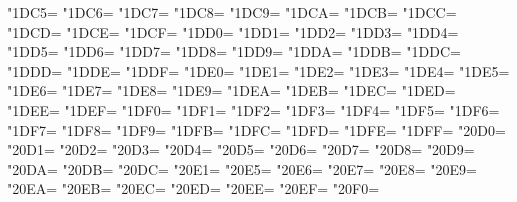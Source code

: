 \XeTeXcharclass"1DC5=\KclassCM
\XeTeXcharclass"1DC6=\KclassCM
\XeTeXcharclass"1DC7=\KclassCM
\XeTeXcharclass"1DC8=\KclassCM
\XeTeXcharclass"1DC9=\KclassCM
\XeTeXcharclass"1DCA=\KclassCM
\XeTeXcharclass"1DCB=\KclassCM
\XeTeXcharclass"1DCC=\KclassCM
\XeTeXcharclass"1DCD=\KclassCM
\XeTeXcharclass"1DCE=\KclassCM
\XeTeXcharclass"1DCF=\KclassCM
\XeTeXcharclass"1DD0=\KclassCM
\XeTeXcharclass"1DD1=\KclassCM
\XeTeXcharclass"1DD2=\KclassCM
\XeTeXcharclass"1DD3=\KclassCM
\XeTeXcharclass"1DD4=\KclassCM
\XeTeXcharclass"1DD5=\KclassCM
\XeTeXcharclass"1DD6=\KclassCM
\XeTeXcharclass"1DD7=\KclassCM
\XeTeXcharclass"1DD8=\KclassCM
\XeTeXcharclass"1DD9=\KclassCM
\XeTeXcharclass"1DDA=\KclassCM
\XeTeXcharclass"1DDB=\KclassCM
\XeTeXcharclass"1DDC=\KclassCM
\XeTeXcharclass"1DDD=\KclassCM
\XeTeXcharclass"1DDE=\KclassCM
\XeTeXcharclass"1DDF=\KclassCM
\XeTeXcharclass"1DE0=\KclassCM
\XeTeXcharclass"1DE1=\KclassCM
\XeTeXcharclass"1DE2=\KclassCM
\XeTeXcharclass"1DE3=\KclassCM
\XeTeXcharclass"1DE4=\KclassCM
\XeTeXcharclass"1DE5=\KclassCM
\XeTeXcharclass"1DE6=\KclassCM
\XeTeXcharclass"1DE7=\KclassCM
\XeTeXcharclass"1DE8=\KclassCM
\XeTeXcharclass"1DE9=\KclassCM
\XeTeXcharclass"1DEA=\KclassCM
\XeTeXcharclass"1DEB=\KclassCM
\XeTeXcharclass"1DEC=\KclassCM
\XeTeXcharclass"1DED=\KclassCM
\XeTeXcharclass"1DEE=\KclassCM
\XeTeXcharclass"1DEF=\KclassCM
\XeTeXcharclass"1DF0=\KclassCM
\XeTeXcharclass"1DF1=\KclassCM
\XeTeXcharclass"1DF2=\KclassCM
\XeTeXcharclass"1DF3=\KclassCM
\XeTeXcharclass"1DF4=\KclassCM
\XeTeXcharclass"1DF5=\KclassCM
\XeTeXcharclass"1DF6=\KclassCM
\XeTeXcharclass"1DF7=\KclassCM
\XeTeXcharclass"1DF8=\KclassCM
\XeTeXcharclass"1DF9=\KclassCM
\XeTeXcharclass"1DFB=\KclassCM
\XeTeXcharclass"1DFC=\KclassCM
\XeTeXcharclass"1DFD=\KclassCM
\XeTeXcharclass"1DFE=\KclassCM
\XeTeXcharclass"1DFF=\KclassCM
\XeTeXcharclass"20D0=\KclassCM
\XeTeXcharclass"20D1=\KclassCM
\XeTeXcharclass"20D2=\KclassCM
\XeTeXcharclass"20D3=\KclassCM
\XeTeXcharclass"20D4=\KclassCM
\XeTeXcharclass"20D5=\KclassCM
\XeTeXcharclass"20D6=\KclassCM
\XeTeXcharclass"20D7=\KclassCM
\XeTeXcharclass"20D8=\KclassCM
\XeTeXcharclass"20D9=\KclassCM
\XeTeXcharclass"20DA=\KclassCM
\XeTeXcharclass"20DB=\KclassCM
\XeTeXcharclass"20DC=\KclassCM
\XeTeXcharclass"20E1=\KclassCM
\XeTeXcharclass"20E5=\KclassCM
\XeTeXcharclass"20E6=\KclassCM
\XeTeXcharclass"20E7=\KclassCM
\XeTeXcharclass"20E8=\KclassCM
\XeTeXcharclass"20E9=\KclassCM
\XeTeXcharclass"20EA=\KclassCM
\XeTeXcharclass"20EB=\KclassCM
\XeTeXcharclass"20EC=\KclassCM
\XeTeXcharclass"20ED=\KclassCM
\XeTeXcharclass"20EE=\KclassCM
\XeTeXcharclass"20EF=\KclassCM
\XeTeXcharclass"20F0=\KclassCM
